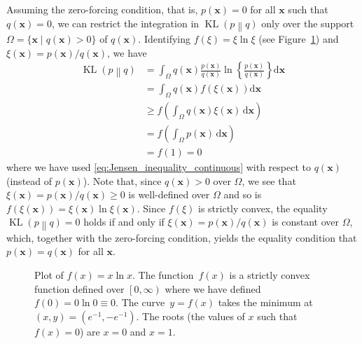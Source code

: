 \documentclass[12pt,a4paper]{article}
\begin{document}
Assuming the zero-forcing condition, that is,
$p(\mathbf{x}) = 0$ for all $\mathbf{x}$ such that $q(\mathbf{x}) = 0$,
we can restrict the integration in $\operatorname{KL}\left( p \middle\| q \right)$
only over the support~$\Omega = \{ \mathbf{x} \mid q(\mathbf{x}) > 0 \}$ of $q(\mathbf{x})$.
Identifying $f(\xi) = \xi\ln\xi$ (see Figure~\ref{fig:x_ln_x}) and
$\xi(\mathbf{x}) = p(\mathbf{x})/q(\mathbf{x})$,
we have
\begin{align}
\operatorname{KL}\left( p \middle\| q \right)
&= \int_{\Omega} q(\mathbf{x})
\frac{p(\mathbf{x})}{q(\mathbf{x})}
\ln \left\{\frac{p(\mathbf{x})}{q(\mathbf{x})}\right\}
\mathrm{d}\mathbf{x} \\
&= \int_{\Omega} q(\mathbf{x})
f\left(\xi(\mathbf{x})\right)
\mathrm{d}\mathbf{x} \\
&\geqslant f\left(
\int_{\Omega} q(\mathbf{x}) \xi(\mathbf{x}) \, \mathrm{d}\mathbf{x}
\right) \\
&= f\left(\int_{\Omega} p(\mathbf{x}) \, \mathrm{d}\mathbf{x} \right) \\
&= f(1) = 0
\end{align}
where we have used \eqref{eq:Jensen_inequality_continuous} with respect to $q(\mathbf{x})$
(instead of $p(\mathbf{x})$).
Note that, since $q(\mathbf{x}) > 0$ over $\Omega$, we see that
$\xi(\mathbf{x}) = p(\mathbf{x})/q(\mathbf{x}) \geqslant 0$ is well-defined over $\Omega$ and
so is $f\left(\xi(\mathbf{x})\right) = \xi(\mathbf{x})\ln\xi(\mathbf{x})$.
Since $f(\xi)$ is strictly convex,
the equality~$\operatorname{KL}\left( p \middle\| q \right) = 0$ holds if and only if
$\xi(\mathbf{x}) = p(\mathbf{x})/q(\mathbf{x})$ is constant over $\Omega$,
which, together with the zero-forcing condition, yields the equality condition that
$p(\mathbf{x}) = q(\mathbf{x})$ for all $\mathbf{x}$.

\begin{figure}
\centering

\caption{Plot of $f(x) = x \ln x$.
The function~$f(x)$ is a strictly convex function defined over $\left[0, \infty\right)$
where we have defined $f(0) = 0 \ln 0 \equiv 0$.
The curve~$y = f(x)$ takes the minimum at $(x, y) = \left(e^{-1}, -e^{-1}\right)$.
The roots (the values of $x$ such that $f(x) = 0$) are $x = 0$ and $x = 1$.}
\label{fig:x_ln_x}
\end{figure}
\end{document}
